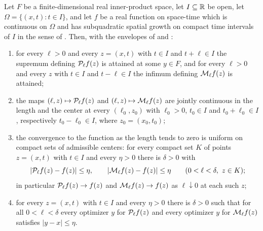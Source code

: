 \begin{lemma}
Let $F$ be a finite-dimensional real inner-product space, let $I\subseteq\mathbb{R}$ be
open, let $\Omega=\{(x,t):t\in I\}$, and let $f$ be a real function on space-time
which is continuous on $\Omega$ and has subquadratic spatial growth on compact
time intervals of $I$ in the sense of . Then, with
the envelopes of  and :
\begin{enumerate}
\item for every $\ell>0$ and every $z=(x,t)$ with $t\in I$ and $t+\ell\in I$ the
supremum defining $\mathcal{P}_\ell f(z)$ is attained at some $y\in F$, and for every
$\ell>0$ and every $z$ with $t\in I$ and $t-\ell\in I$ the infimum defining
$\mathcal{M}_\ell f(z)$ is attained;
\item the maps $(\ell,z)\mapsto\mathcal{P}_\ell f(z)$ and
$(\ell,z)\mapsto\mathcal{M}_\ell f(z)$ are jointly continuous in the length and the
center at every $(\ell_0,z_0)$ with $\ell_0>0$, $t_0\in I$ and
$t_0+\ell_0\in I$, respectively $t_0-\ell_0\in I$, where $z_0=(x_0,t_0)$;
\item the convergence to the function as the length tends to zero is uniform on
compact sets of admissible centers: for every compact set $K$ of points
$z=(x,t)$ with $t\in I$ and every $\eta>0$ there is $\delta>0$ with
\[
  |\mathcal{P}_\ell f(z)-f(z)|\le\eta,\qquad
  |\mathcal{M}_\ell f(z)-f(z)|\le\eta
  \qquad(0<\ell<\delta,\ z\in K);
\]
in particular $\mathcal{P}_\ell f(z)\to f(z)$ and $\mathcal{M}_\ell f(z)\to f(z)$ as
$\ell\downarrow0$ at each such $z$;
\item for every $z=(x,t)$ with $t\in I$ and every $\eta>0$ there is $\delta>0$
such that for all $0<\ell<\delta$ every optimizer $y$ for
$\mathcal{P}_\ell f(z)$ and every optimizer $y$ for $\mathcal{M}_\ell f(z)$ satisfies
$|y-x|\le\eta$.
\end{enumerate}
\end{lemma}
